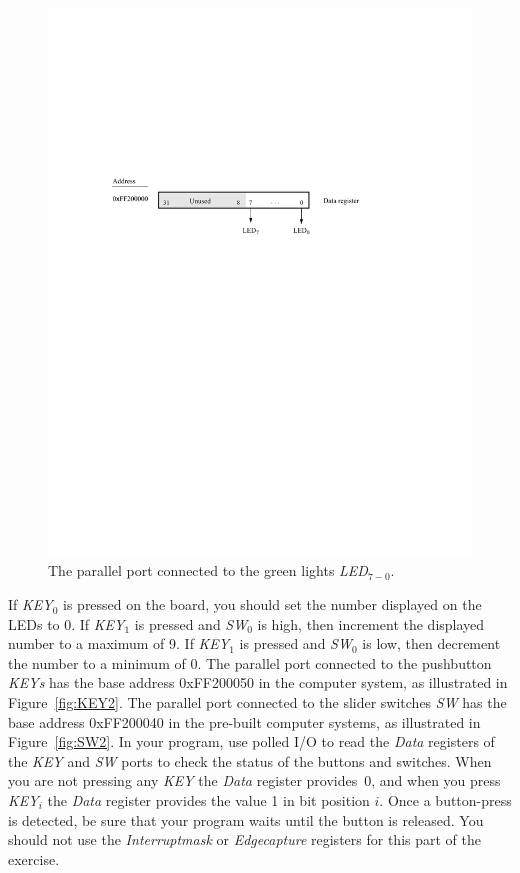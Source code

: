 \documentclass[epsfig,10pt,fullpage]{article}
\begin{document}
\begin{figure}[htb]
	\begin{center}
	\includegraphics[scale=1]{figures/DE0_Nano_SoC/figureLED.pdf}
	\end{center}
	\caption{The parallel port connected to the green lights {\it LED}$_{7-0}$.}
\label{fig:LED2}
\end{figure}

\noindent
If {\it KEY}$_0$ is pressed on the board, you should set the number displayed on the
LEDs to 0. If {\it KEY}$_1$ is pressed and {\it SW}$_0$ is high, then increment the displayed
number to a maximum of 9. If {\it KEY}$_1$ is pressed and {\it SW}$_0$ is low, then decrement the
number to a minimum of 0. The parallel port connected to the pushbutton {\it KEYs} has the base address
{\sf 0xFF200050} in the computer system, as illustrated 
in Figure~\ref{fig:KEY2}.
The parallel port connected to the slider switches {\it SW} has the base address {\sf 0xFF200040} 
in the pre-built computer systems, as illustrated in Figure~\ref{fig:SW2}.
In your program, use polled I/O to read the {\it Data} registers of the {\it KEY} and {\it SW}
ports to check the status of the buttons and switches. When you are not pressing 
any {\it KEY} the {\it Data} register provides~0, and when you press {\it KEY}$_i$ the 
{\it Data} register provides the value 1 in bit position $i$. Once a button-press is detected,
be sure that your program waits until the button is released. You should not use the 
{\it Interruptmask} or {\it Edgecapture} registers for this part of the exercise.
\end{document}
